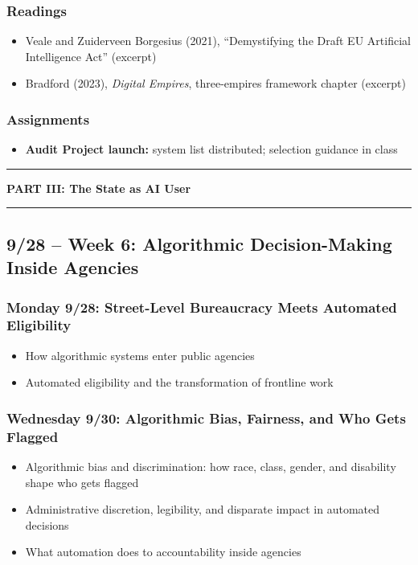 \documentclass[12pt]{article}
\begin{document}
    \subsubsection*{Readings}
        \begin{itemize}
            \item Veale and Zuiderveen Borgesius (2021), ``Demystifying the Draft EU Artificial Intelligence Act'' (excerpt)
            \item Bradford (2023), \emph{Digital Empires}, three-empires framework chapter (excerpt)
        \end{itemize}
    \subsubsection*{Assignments}
        \begin{itemize}
            \item \textbf{Audit Project launch:} system list distributed; selection guidance in class
        \end{itemize}

\bigskip
\noindent\rule{\textwidth}{0.6pt}
\begin{center}\textbf{PART III: The State as AI User}\end{center}
\noindent\rule{\textwidth}{0.6pt}

\subsection*{9/28 -- Week 6: Algorithmic Decision-Making Inside Agencies}
    \subsubsection*{Monday 9/28: Street-Level Bureaucracy Meets Automated Eligibility}
        \begin{itemize}
            \item How algorithmic systems enter public agencies
            \item Automated eligibility and the transformation of frontline work
        \end{itemize}
    \subsubsection*{Wednesday 9/30: Algorithmic Bias, Fairness, and Who Gets Flagged}
        \begin{itemize}
            \item Algorithmic bias and discrimination: how race, class, gender, and disability shape who gets flagged
            \item Administrative discretion, legibility, and disparate impact in automated decisions
            \item What automation does to accountability inside agencies
        \end{itemize}
\end{document}
